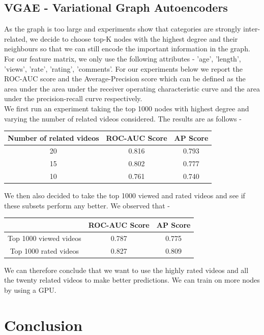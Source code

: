 \documentclass[10pt,twocolumn,letterpaper]{article}
\begin{document}
\subsection{VGAE - Variational Graph Autoencoders}

As the graph is too large and experiments show that categories are strongly inter-related, we decide to choose top-K nodes with the highest degree and their neighbours so that we can still encode the important information in the graph. For our feature matrix, we only use the following attributes - 'age', 'length', 'views', 'rate', 'rating', 'comments'. For our experiments below we report the ROC-AUC score and the Average-Precision score which can be defined as the area under the area under the receiver operating characteristic curve and the area under the precision-recall curve respectively. \\
We first run an experiment taking the top 1000 nodes with highest degree and varying the number of related videos considered. The results are as follows -  

\begin{center}
\begin{tabular}{|c|c|c|}
\hline
Number of related videos & ROC-AUC Score & AP Score \\
\hline\hline
20 & 0.816 & 0.793\\
15 & 0.802 & 0.777 \\
10 & 0.761 & 0.740 \\
\hline
\end{tabular}
\end{center}
We then also decided to take the top 1000 viewed and rated videos and see if these subsets perform any better. We observed that - 

\begin{center}
\begin{tabular}{|c|c|c|}
\hline
 & ROC-AUC Score & AP Score \\
\hline\hline
Top 1000 viewed videos & 0.787 & 0.775\\
Top 1000 rated videos & 0.827 & 0.809 \\
\hline
\end{tabular}
\end{center}
We can therefore conclude that we want to use the highly rated videos and all the twenty related videos to make better predictions. We can train on more nodes by using a GPU.

\section{Conclusion}
\end{document}
